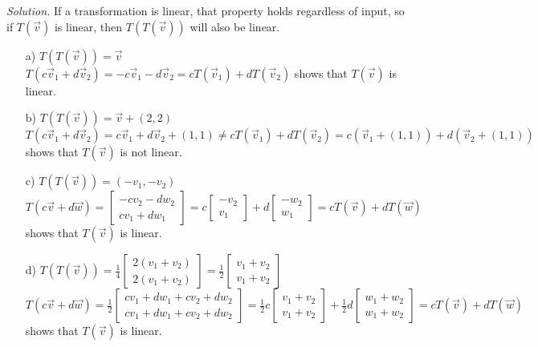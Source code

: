 \documentclass[12pt,pdftex]{article}
\begin{document}
\begin{itemize}
\textit{Solution.}
If a transformation is linear, that property holds regardless of input, so if $T(\vec{v})$ is linear, then 
$T(T(\vec{v}))$ will also be linear.
\begin{itemize}
\item[a)] $T(T(\vec{v}))=\vec{v}$ \\
			$T(c\vec{v}_1+d\vec{v}_2)=-c\vec{v}_1-d\vec{v}_2=cT(\vec{v}_1)+dT(\vec{v}_2)$ shows that $T(\vec{v})$ is linear.
\item[b)] $T(T(\vec{v}))=\vec{v}+(2,2)$ \\
			$T(c\vec{v}_1+d\vec{v}_2)=c\vec{v}_1+d\vec{v}_2+(1,1) \neq
            cT(\vec{v}_1)+dT(\vec{v}_2)=c(\vec{v}_1+(1,1))+d(\vec{v}_2+(1,1))$ shows that $T(\vec{v})$ is not linear.
\item[c)] $T(T(\vec{v}))=(-v_1,-v_2)$ \\
			$T(c\vec{v}+d\vec{w})=\begin{bmatrix}
			-cv_2-dw_2 \\ cv_1+dw_1
			\end{bmatrix} = c\begin{bmatrix}
			-v_2 \\ v_1
			\end{bmatrix}+d\begin{bmatrix}
			-w_2 \\ w_1
			\end{bmatrix}=cT(\vec{v})+dT(\vec{w})$ shows that $T(\vec{v})$ is linear.
\item[d)] $T(T(\vec{v}))=\frac{1}{4}\begin{bmatrix}
			2(v_1+v_2) \\ 2(v_1+v_2)
			\end{bmatrix} = \frac{1}{2}\begin{bmatrix}
			v_1+v_2 \\ v_1+v_2
			\end{bmatrix}$ \\
            $T(c\vec{v}+d\vec{w})=\frac{1}{2}\begin{bmatrix}
            cv_1+dw_1+cv_2+dw_2 \\ cv_1+dw_1+cv_2+dw_2
            \end{bmatrix} = \frac{1}{2}c\begin{bmatrix}
            v_1+v_2 \\ v_1+v_2
            \end{bmatrix}+\frac{1}{2}d\begin{bmatrix}
            w_1+w_2 \\ w_1+w_2
            \end{bmatrix}=cT(\vec{v})+dT(\vec{w})$ shows that $T(\vec{v})$ is linear.
\end{itemize}


\end{itemize}
\end{document}
